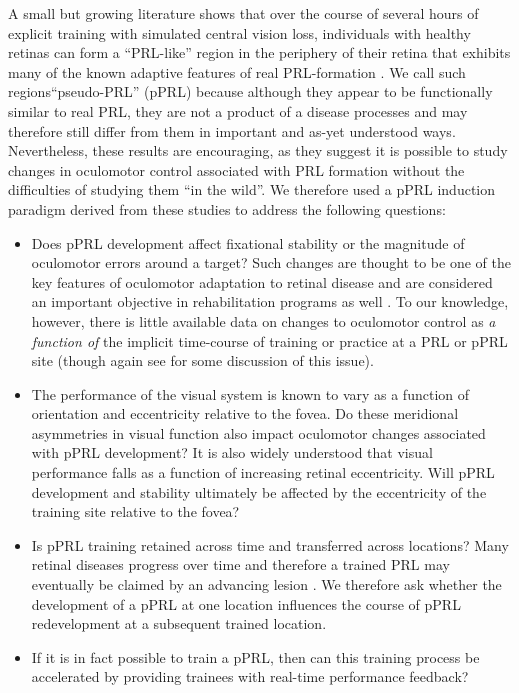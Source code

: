 A small but growing literature shows that over the course of several hours of explicit training with simulated central vision loss, individuals with healthy retinas can form a ``PRL-like'' region in the periphery of their retina that exhibits many of the known adaptive features of real PRL-formation \citep{varsori_2004,kwon_2013,walsh_2014}. We call such regions``pseudo-PRL'' (pPRL) because although they appear to be functionally similar to real PRL, they are not a product of a disease processes and may therefore still differ from them in important and as-yet understood ways. Nevertheless, these results are encouraging, as they suggest it is possible to study changes in oculomotor control associated with PRL formation without the difficulties of studying them ``in the wild''.  We therefore used a pPRL induction paradigm derived from these studies to address the following questions:

\begin{itemize}
\item Does pPRL development affect fixational stability or the magnitude of oculomotor errors around a target? Such changes are thought to be one of the key features of oculomotor adaptation to retinal disease \citep{crossland_2004} and are considered an important objective in rehabilitation programs as well \citep{mandelcorn_2013}. To our knowledge, however, there is little available data on changes to oculomotor control as \textit{a function of} the implicit time-course of training or practice at a PRL or pPRL site (though again see \cite{walsh_2014,kwon_2013,varsori_2004} for some discussion of this issue).

\item The performance of the visual system is known to vary as a function of orientation and eccentricity relative to the fovea. Do these meridional asymmetries in visual function also impact oculomotor changes associated with pPRL development? It is also widely understood that visual performance falls as a function of increasing retinal eccentricity. Will pPRL development and stability ultimately be affected by the eccentricity of the training site relative to the fovea?

\item Is pPRL training retained across time and transferred across locations? Many retinal diseases progress over time and therefore a trained PRL may eventually be claimed by an advancing lesion \citep{nilsson_1998}. We therefore ask whether the development of a pPRL at one location influences the course of pPRL redevelopment at a subsequent trained location.

\item If it is in fact possible to train a pPRL, then can this training process be accelerated by providing trainees with real-time performance feedback?
\end{itemize}

